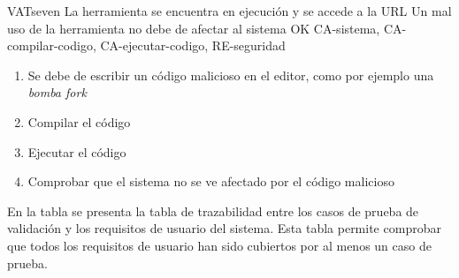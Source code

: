 \begin{testCase}{VAT}{seven}
    {La herramienta se encuentra en ejecución y se accede a la URL}
    {\NA}
    {Un mal uso de la herramienta no debe de afectar al sistema}
    {OK}
    {CA-sistema, CA-compilar-codigo, CA-ejecutar-codigo, RE-seguridad}
    \begin{enumerate}
        \item Se debe de escribir un código malicioso en el editor, como por ejemplo una \textit{bomba fork}
        \item Compilar el código
        \item Ejecutar el código
        \item Comprobar que el sistema no se ve afectado por el código malicioso        
    \end{enumerate}
\end{testCase}
    


En la tabla  se presenta la tabla de trazabilidad entre los casos de prueba de validación y los requisitos de usuario del sistema. Esta tabla permite comprobar que todos los requisitos de usuario han sido cubiertos por al menos un caso de prueba.
\FloatBarrier

\begin{landscape}
    \begin{table}[htb]
          {\traceabilityVATUR}
      \end{table}
    \end{landscape}
    

